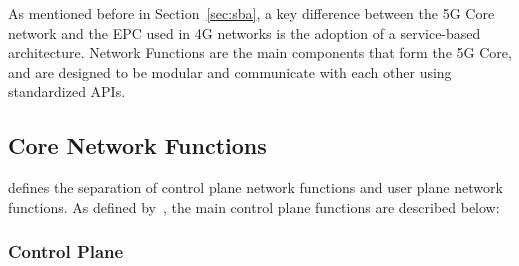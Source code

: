 As mentioned before in Section~\ref{sec:sba}, a key difference between the 5G Core network and the \gls{EPC} used in 4G networks is the adoption of a service-based architecture. Network Functions are the main components that form the 5G Core, and are designed to be modular and communicate with each other using standardized \glspl{API}.

\subsection{Core Network Functions}
\label{sec:5g_core_network_functions}
 defines the separation of control plane network functions and user plane network functions. As defined by~\textcite{rommer2020:5g_core_networks}, the main control plane functions are described below:
\subsubsection{Control Plane}
\label{sec:control_plane}


